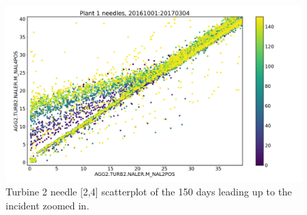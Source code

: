         \begin{figure}
            \centering
            \includegraphics[width=\textwidth]{report/figures/analysis/plant1_error/needle_2_4_20161001-20170304_40_dots.png}
            \caption{Turbine 2 needle [2,4] scatterplot of the 150 days leading up to the incident zoomed in.}
            \label{fig:plan1_scatter_20161001-20170304_40}
        \end{figure}
        
        

